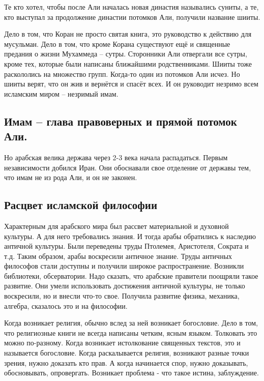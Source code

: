     Те кто хотел, чтобы после Али началась новая династия назывались суниты, а те, кто выступал за продолжение династии потомков Али, получили название шииты.

Дело в том, что Коран не просто святая книга, это руководство к действию для мусульман. Дело в том, что кроме Корана существуют ещё и священные предания о жизни Мухаммеда – сутры. Сторонники Али отвергали все сутры, кроме тех, которые были написаны ближайшими родственниками. Шииты тоже раскололись на множество групп. Когда-то один из потомков Али исчез. Но шииты верят, что он жив и вернётся и спасёт всех. И он руководит незримо всем исламским миром – незримый имам.

    \subsection{Имам – глава правоверных и прямой потомок Али.}

Но арабская велика держава через 2-3 века начала распадаться. Первым независимости добился Иран. Они обоснавали свое отделение от державы тем, что имам не из рода Али, и он не законен.

\subsection{ Расцвет исламской философии}

Характерным для арабского мира был рассвет материальной и духовной культуры. А для него требовались знания. И тогда арабы обратились к наследию античной культуры. Были переведены труды Птолемея, Аристотеля, Сократа и т.д. Таким образом, арабы воскресили античное знание. Труды античных философов стали доступны и получили широкое распространение. Возникли библиотеки, обсерватории. Надо сказать, что арабские правители поощряли такое развитие. Они умели использовать достижения античной культуры, не только воскресили, но и внесли что-то свое. Получила развитие физика, механика, алгебра, сказалось это и на философии.

Когда возникает религия, обычно вслед за ней возникает богословие. Дело в том, что религиозные книги не всегда написаны четким, ясным языком. Толковать это можно по-разному. Когда возникает истолкование священных текстов, это и называется богословие. Когда раскалывается религия, возникают разные точки зрения, нужно доказать кто прав. А когда начинается спор, нужно доказывать, обосновывать, опровергать. Возникает проблема - что такое истина, заблуждение.

